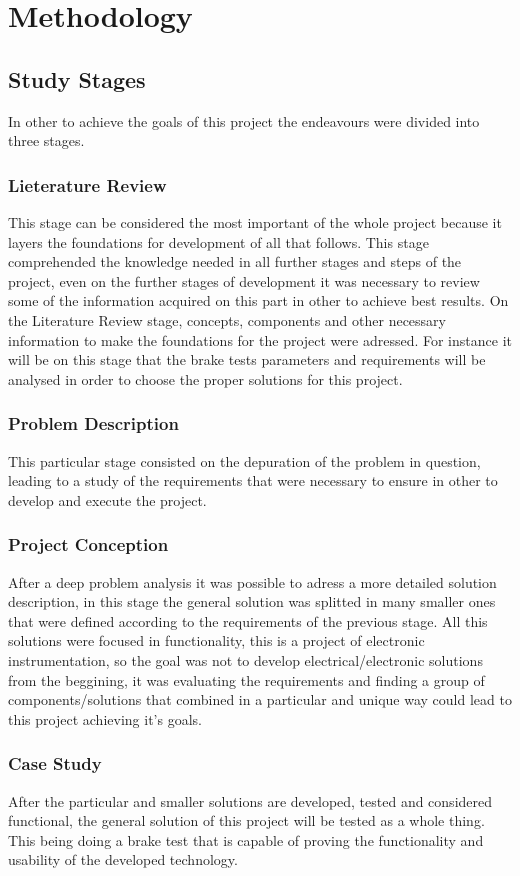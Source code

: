 \chapter{Methodology}

	\section{Study Stages}
		In other to achieve the goals of this project the endeavours were divided into three stages.

	\subsection{Lieterature Review}
		This stage can be considered the most important of the whole project because it layers the foundations for development of all that follows. This stage comprehended the knowledge needed in all further stages and steps of the project, even on the further stages of development it was necessary to review some of the information acquired on this part in other to achieve best results. On the Literature Review stage, concepts, components and other necessary information to make the foundations for the project were adressed. For instance it will be on this stage that the brake tests parameters and requirements will be analysed in order to choose the proper solutions for this project.

	\subsection{Problem Description}
		This particular stage consisted on the depuration of the problem in question, leading to a study of the requirements that were necessary to ensure in other to develop and execute the project. 

	\subsection{Project Conception}
		After a deep problem analysis it was possible to adress a more detailed solution description, in this stage the general solution was splitted in many smaller ones that were defined according to the requirements of the previous stage. All this solutions were focused in functionality, this is a project of electronic instrumentation, so the goal was not to develop electrical/electronic solutions from the beggining, it was evaluating the requirements and finding a group of components/solutions that combined in a particular and unique way could lead to this project achieving it's goals.
		
	\subsection{Case Study}
		After the particular and smaller solutions are developed, tested and considered functional, the general solution of this project will be tested as a whole thing. This being doing a brake test that is capable of proving the functionality and usability of the developed technology.